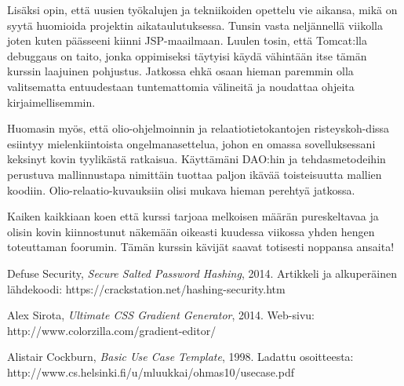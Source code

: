 \documentclass[11pt]{article}
\begin{document}
		Lisäksi opin, että uusien työkalujen ja tekniikoiden opettelu vie aikansa, mikä on syytä huomioida
		projektin aikataulutuksessa. Tunsin vasta neljännellä viikolla joten kuten päässeeni kiinni
		JSP-maailmaan. Luulen tosin, että Tomcat:lla debuggaus on taito, jonka oppimiseksi täytyisi käydä
		vähintään itse tämän kurssin laajuinen pohjustus. Jatkossa ehkä osaan hieman paremmin olla valitsematta
		entuudestaan tuntemattomia välineitä ja noudattaa ohjeita kirjaimellisemmin.
		
		Huomasin myös, että olio-ohjelmoinnin ja relaatiotietokantojen risteyskoh-dissa esiintyy
		mielenkiintoista ongelmanasettelua, johon en omassa sovelluksessani keksinyt kovin tyylikästä
		ratkaisua. Käyttämäni DAO:hin ja tehdasmetodeihin perustuva mallinnustapa nimittäin tuottaa paljon
		ikävää toisteisuutta mallien koodiin. Olio-relaatio-kuvauksiin olisi mukava hieman perehtyä jatkossa. 
		
		Kaiken kaikkiaan koen että kurssi tarjoaa melkoisen määrän pureskeltavaa ja olisin kovin kiinnostunut
		näkemään oikeasti kuudessa viikossa yhden hengen toteuttaman foorumin. Tämän kurssin kävijät saavat
		totisesti noppansa ansaita!
\newpage
\thispagestyle{plain}
\listoffigures

\newpage
\thispagestyle{plain}
	\begin{thebibliography}{9}
			
			Defuse Security,
			\emph{Secure Salted Password Hashing}, 2014. Artikkeli ja alkuperäinen lähdekoodi: 
			https://crackstation.net/hashing-security.htm
			
			Alex Sirota,
			\emph{Ultimate CSS Gradient Generator}, 2014. Web-sivu:\\  
			http://www.colorzilla.com/gradient-editor/
	
			Alistair Cockburn,
			\emph{Basic Use Case Template}, 1998. Ladattu osoitteesta:\\ http://www.cs.helsinki.fi/u/mluukkai/ohmas10/usecase.pdf
	
	\end{thebibliography}
	
\end{document}
